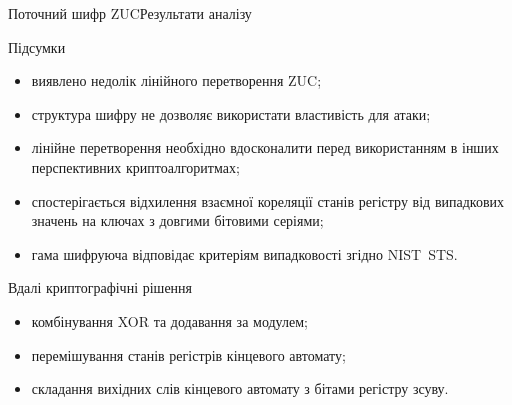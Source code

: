 \documentclass[10pt, ucs, handout]{beamer}
\begin{document}
\begin{frame}{Поточний шифр ZUC}{Результати аналізу}
    \small
    \begin{block}{Підсумки}
        \begin{itemize}
            \item виявлено недолік лінійного перетворення ZUC;
            \item структура шифру не дозволяє використати властивість для атаки;
            \item лінійне перетворення необхідно вдосконалити перед
                використанням в інших перспективних криптоалгоритмах;
            \item спостерігається відхилення взаємної кореляції станів регістру
                від випадкових значень на ключах з довгими бітовими серіями;
            \item гама шифруюча відповідає критеріям випадковості згідно NIST~STS.
        \end{itemize}
    \end{block}
    \begin{block}{Вдалі криптографічні рішення}
        \begin{itemize}
            \item комбінування XOR та додавання за модулем;
            \item перемішування станів регістрів кінцевого автомату;
            \item складання вихідних слів кінцевого автомату з бітами регістру
                зсуву.
        \end{itemize}
    \end{block}
\end{frame}
\end{document}
